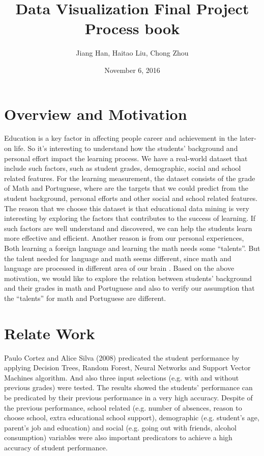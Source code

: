 \documentclass{article}
\author{Jiang Han, Haitao Liu, Chong Zhou}
\begin{document}
\title{Data Visualization Final Project Process book} 
\date{November 6, 2016}
\maketitle

\section{Overview and Motivation}
Education is a key factor in affecting people career and achievement in the later-on life. So it's interesting to understand how the students' background and personal effort impact the learning process. We have a real-world dataset that include such factors, such as student grades, demographic, social and school related features. For the learning measurement, the dataset consists of the grade of Math and Portuguese, where are the targets that we could predict from the student background, personal efforts and other social and school related features. The reason that we choose this dataset is that educational data mining is very interesting by exploring the factors that contributes to the success of learning. If such factors are well understand and discovered, we can help the students learn more effective and efficient. Another reason is from our personal experiences, Both learning a foreign language and learning the math needs some ``talents''. But the talent needed for language and math seems different, since math and language are processed in different area of our brain . Based on the above motivation, we would like to explore the relation between students' background and their grades in math and Portuguese and also to verify our assumption that the ``talents'' for math and Portuguese are different.

\section{Relate Work}
Paulo Cortez and Alice Silva (2008) predicated the student performance by applying Decision Trees, Random Forest, Neural Networks and Support Vector Machines algorithm. And also three input selections (e.g. with and without previous grades) were tested. The results showed the students' performance can be predicated by their previous performance in a very high accuracy. Despite of the previous performance, school related
(e.g. number of absences, reason to choose school, extra educational school support), demographic (e.g. student's age, parent's job and education) and social (e.g. going out with friends, alcohol consumption) variables were also important predicators to achieve a high accuracy of student performance.
\end{document}

